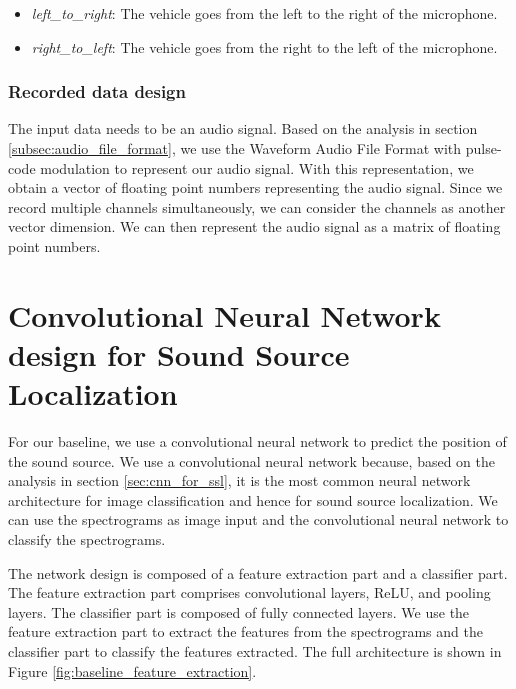 \begin{itemize}
    \item  \textit{left\_to\_right}:  The vehicle goes from the left to the right of the microphone.
    \item  \textit{right\_to\_left}:  The vehicle goes from the right to the left of the microphone.
\end{itemize}

\subsubsection{Recorded data design}

The input data needs to be an audio signal. Based on the analysis in section \ref{subsec:audio_file_format}, we use the Waveform Audio File Format with pulse-code modulation to represent our audio signal. With this representation, we obtain a vector of floating point numbers representing the audio signal. Since we record multiple channels simultaneously, we can consider the channels as another vector dimension. We can then represent the audio signal as a matrix of floating point numbers.

\section{Convolutional Neural Network design for Sound Source Localization}
\label{sec:cnn_design_for_ssl}

For our baseline, we use a convolutional neural network to predict the position of the sound source. We use a convolutional neural network because, based on the analysis in section \ref{sec:cnn_for_ssl}, it is the most common neural network architecture for image classification and hence for sound source localization. We can use the spectrograms as image input and the convolutional neural network to classify the spectrograms.

The network design is composed of a feature extraction part and a classifier part. The feature extraction part comprises convolutional layers, ReLU, and pooling layers. The classifier part is composed of fully connected layers. We use the feature extraction part to extract the features from the spectrograms and the classifier part to classify the features extracted. The full architecture is shown in Figure \ref{fig:baseline_feature_extraction}.

